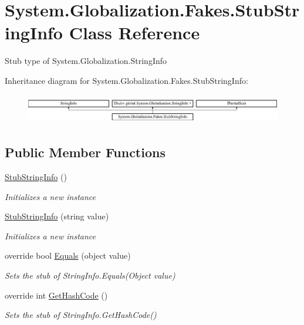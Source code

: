\hypertarget{class_system_1_1_globalization_1_1_fakes_1_1_stub_string_info}{\section{System.\-Globalization.\-Fakes.\-Stub\-String\-Info Class Reference}
\label{class_system_1_1_globalization_1_1_fakes_1_1_stub_string_info}
}


Stub type of System.\-Globalization.\-String\-Info 


Inheritance diagram for System.\-Globalization.\-Fakes.\-Stub\-String\-Info\-:\begin{figure}[H]
\begin{center}
\leavevmode
\includegraphics[height=1.314554cm]{class_system_1_1_globalization_1_1_fakes_1_1_stub_string_info}
\end{center}
\end{figure}
\subsection*{Public Member Functions}
\begin{DoxyCompactItemize}
\item 
\hyperlink{class_system_1_1_globalization_1_1_fakes_1_1_stub_string_info_a55ba3f1dbfaefdbdd3fe5a38dccf5320}{Stub\-String\-Info} ()
\begin{DoxyCompactList}\small\item\em Initializes a new instance\end{DoxyCompactList}\item 
\hyperlink{class_system_1_1_globalization_1_1_fakes_1_1_stub_string_info_a38de5d7057134ebcd6d381e422474a08}{Stub\-String\-Info} (string value)
\begin{DoxyCompactList}\small\item\em Initializes a new instance\end{DoxyCompactList}\item 
override bool \hyperlink{class_system_1_1_globalization_1_1_fakes_1_1_stub_string_info_a7f8d275965466bf5a399ef84deb9d511}{Equals} (object value)
\begin{DoxyCompactList}\small\item\em Sets the stub of String\-Info.\-Equals(\-Object value)\end{DoxyCompactList}\item 
override int \hyperlink{class_system_1_1_globalization_1_1_fakes_1_1_stub_string_info_a26a9a161f6cf48900349616be11749f1}{Get\-Hash\-Code} ()
\begin{DoxyCompactList}\small\item\em Sets the stub of String\-Info.\-Get\-Hash\-Code()\end{DoxyCompactList}\end{DoxyCompactItemize}
